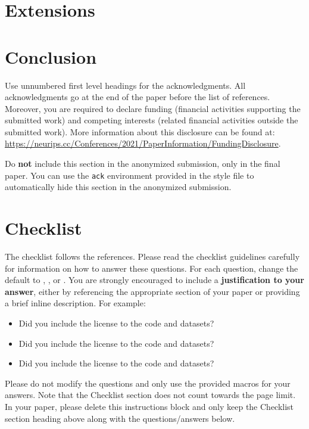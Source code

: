 \documentclass{article}
\begin{document}
\section{Extensions}

\section{Conclusion}

\begin{ack}
Use unnumbered first level headings for the acknowledgments. All acknowledgments
go at the end of the paper before the list of references. Moreover, you are required to declare
funding (financial activities supporting the submitted work) and competing interests (related financial activities outside the submitted work).
More information about this disclosure can be found at: \url{https://neurips.cc/Conferences/2021/PaperInformation/FundingDisclosure}.

Do {\bf not} include this section in the anonymized submission, only in the final paper. You can use the \texttt{ack} environment provided in the style file to automatically hide this section in the anonymized submission.
\end{ack}



\section*{Checklist}

The checklist follows the references.  Please
read the checklist guidelines carefully for information on how to answer these
questions.  For each question, change the default \answerTODO{} to \answerYes{},
\answerNo{}, or \answerNA{}.  You are strongly encouraged to include a {\bf
justification to your answer}, either by referencing the appropriate section of
your paper or providing a brief inline description.  For example:
\begin{itemize}
  \item Did you include the license to the code and datasets? 
  \item Did you include the license to the code and datasets? 
  \item Did you include the license to the code and datasets? \answerNA{}
\end{itemize}
Please do not modify the questions and only use the provided macros for your
answers.  Note that the Checklist section does not count towards the page
limit.  In your paper, please delete this instructions block and only keep the
Checklist section heading above along with the questions/answers below.
\end{document}
